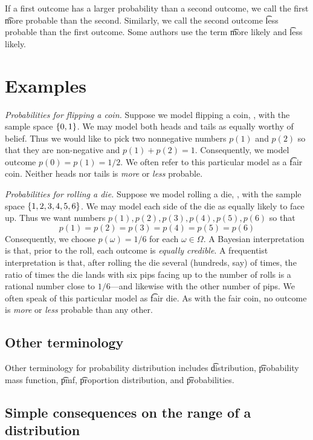 If a first outcome has a larger probability than a second outcome, we call the first \t{more probable} than the second.
Similarly, we call the second outcome \t{less probable} than the first outcome.
Some authors use the term \t{more likely} and \t{less likely}.

\section*{Examples}

\textit{Probabilities for flipping a coin.}
Suppose we model flipping a coin, , with the sample space $\{0,1\}$.
We may model both heads and tails as equally worthy of belief.
Thus we would like to pick two nonnegative numbers $p(1)$ and $p(2)$ so that they are non-negative and $p(1) + p(2) = 1$.
Consequently, we model outcome $p(0) = p(1) = 1/2 $.
We often refer to this particular model as a \t{fair coin}.
Neither heads nor tails is \textit{more} or \textit{less} probable.

\textit{Probabilities for rolling a die.}
Suppose we model rolling a die, , with the sample space $\{1, 2, 3, 4, 5, 6\}$.
We may model each side of the die as equally likely to face up.
Thus we want numbers $p(1), p(2), p(3), p(4), p(5), p(6)$ so that
\[
p(1) = p(2) = p(3) = p(4) = p(5) = p(6)
\]
Consequently, we choose $p(\omega ) = 1/6$ for each $\omega  \in \Omega $.
A Bayesian interpretation is that, prior to the roll, each outcome is \textit{equally credible}.
A frequentist interpretation is that, after rolling the die several (hundreds, say) of times, the ratio of times the die lands with six pips facing up to the number of rolls is a rational number close to $1/6$---and likewise with the other number of pips.
We often speak of this particular model as \t{fair die}.
As with the fair coin, no outcome is \textit{more} or \textit{less} probable than any other.

\subsection*{Other terminology}

Other terminology for probability distribution includes \t{distribution}, \t{probability mass function}, \t{pmf}, \t{proportion distribution}, and \t{probabilities}.
\subsection*{Simple consequences on the range of a distribution}

